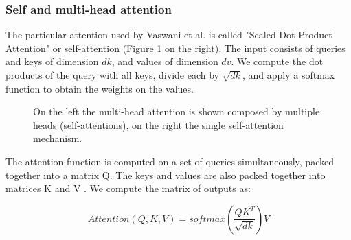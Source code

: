\subsubsection{Self and multi-head attention}
The particular attention used by Vaswani et al.\cite{vaswani2017attention} is called "Scaled Dot-Product Attention" or self-attention (Figure \ref{fig:transformer_attention} on the right). The input consists of queries and keys of dimension $dk$, and values of dimension $dv$. We compute the dot products of the query with all keys, divide each by $\sqrt{dk}$, and apply a softmax function to obtain the weights on the values.
\begin{figure}[H]%
    \centering
    \caption{On the left the multi-head attention is shown composed by multiple heads (self-attentions), on the right the single self-attention mechanism.}
    \label{fig:transformer_attention}%
\end{figure}
The attention function is computed on a set of queries simultaneously, packed together into a matrix Q. The keys and values are also packed together into matrices K and V . We compute the matrix of outputs as:
\begin{large}
$$Attention(Q, K, V ) = softmax(\frac{QK^T}{\sqrt{dk}})V$$
\end{large}

